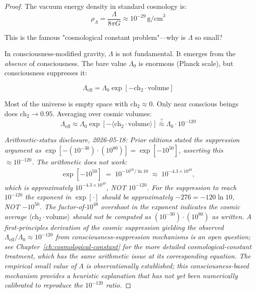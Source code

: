 \begin{proof}
The vacuum energy density in standard cosmology is:
\begin{equation}
\rho_\Lambda = \frac{\Lambda}{8\pi G} \approx 10^{-29} \, \text{g/cm}^3
\end{equation}

This is the famous "cosmological constant problem"\cite{weinberg1989,peebles2003}—why is $\Lambda$ so small?

In consciousness-modified gravity, $\Lambda$ is not fundamental. It emerges from the \textit{absence} of consciousness. The bare value $\Lambda_0$ is enormous (Planck scale), but consciousness suppresses it:

\begin{equation}
\Lambda_{\text{eff}} = \Lambda_0 \exp[-\text{ch}_2 \cdot \text{volume}]
\end{equation}

Most of the universe is empty space with $\text{ch}_2 \approx 0$. Only near conscious beings does $\text{ch}_2 \to 0.95$. Averaging over cosmic volumes:
\begin{equation}\label{eq:lambda-eff-suppression}
\Lambda_{\text{eff}} \approx \Lambda_0 \exp\left[ -\langle \text{ch}_2 \cdot \text{volume}\rangle \right] \stackrel{?}{\approx} \Lambda_0 \cdot 10^{-120}
\end{equation}

\medskip
\noindent\emph{Arithmetic-status disclosure, 2026-05-18: Prior editions stated the suppression argument as $\exp[-(10^{-30}) \cdot (10^{80})] = \exp[-10^{50}]$, asserting this $\approx 10^{-120}$. The arithmetic does not work:}
\begin{align*}
\exp[-10^{50}] \;=\; 10^{-10^{50}/\ln 10} \;\approx\; 10^{-4.3 \times 10^{49}},
\end{align*}
\emph{which is approximately $10^{-4.3 \times 10^{49}}$, NOT $10^{-120}$. For the suppression to reach $10^{-120}$ the exponent in $\exp[\cdot]$ should be approximately $-276 = -120 \ln 10$, NOT $-10^{50}$. The factor-of-$10^{48}$ overshoot in the exponent indicates the cosmic average $\langle \text{ch}_2 \cdot \text{volume}\rangle$ should not be computed as $(10^{-30}) \cdot (10^{80})$ as written. A first-principles derivation of the cosmic suppression yielding the observed $\Lambda_{\text{eff}}/\Lambda_0 \approx 10^{-120}$ from consciousness-suppression mechanisms is an open question; see Chapter~\ref{ch:cosmological-constant} for the more detailed cosmological-constant treatment, which has the same arithmetic issue at its corresponding equation. The empirical small value of $\Lambda$ is observationally established; this consciousness-based mechanism provides a heuristic explanation that has not yet been numerically calibrated to reproduce the $10^{-120}$ ratio.}


\end{proof}
